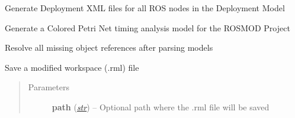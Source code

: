 \documentclass[letterpaper,10pt,english]{sphinxmanual}
\begin{document}
\begin{fulllineitems}
\begin{fulllineitems}
\end{fulllineitems}


\begin{fulllineitems}
\label{class_Project:ROSMOD_Project.generate_xml}
Generate Deployment XML files for all ROS nodes in the Deployment Model

\end{fulllineitems}


\begin{fulllineitems}
\label{class_Project:ROSMOD_Project.generate_cpn}
Generate a Colored Petri Net timing analysis model for the ROSMOD Project

\end{fulllineitems}


\begin{fulllineitems}
\label{class_Project:ROSMOD_Project.resolve_references}
Resolve all missing object references after parsing models

\end{fulllineitems}


\begin{fulllineitems}
\label{class_Project:ROSMOD_Project.save_rml}
Save a modified workspace (.rml) file
\begin{quote}\begin{description}
\item[{Parameters}] \leavevmode
\textbf{path} (\href{http://docs.python.org/library/functions.html\#str}{\emph{str}}) -- Optional path where the .rml file will be saved

\end{description}\end{quote}

\end{fulllineitems}



\end{fulllineitems}
\end{document}
